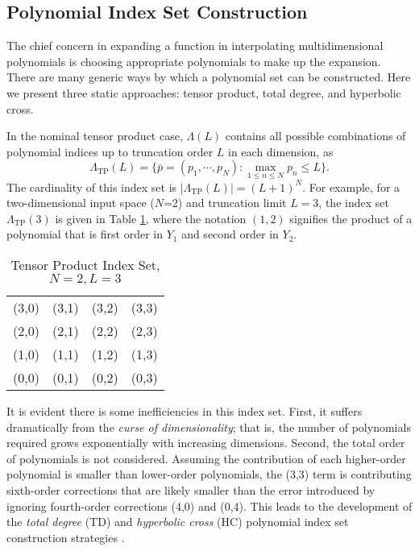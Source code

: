 \subsection{Polynomial Index Set Construction}\label{sec:index sets}
The chief concern in expanding a function in interpolating multidimensional polynomials is choosing appropriate polynomials to
make up the expansion.
There are many generic ways by which a polynomial set can be constructed.  Here we present three static
approaches: tensor
product, total degree, and hyperbolic cross.

In the nominal tensor
product case, $\Lambda(L)$ contains all possible combinations of polynomial indices up to truncation order $L$ in each
dimension, as
\begin{equation}
  \Lambda_\text{TP}(L)=\Big\{\bar p=(p_1,\cdots,p_N): \max_{1\leq n\leq N}p_n\leq L
\Big\}.
\end{equation}
The cardinality of this index set is $|\Lambda_\text{TP}(L)|=(L+1)^N$. For example, for a two-dimensional
input space ($N$=2) and truncation limit $L=3$, the index set $\Lambda_\text{TP}(3)$ is given in Table
\ref{tab:TP}, where the notation $(1,2)$ signifies the product of a polynomial that is first order in $Y_1$
and second order in $Y_2$.

\begin{table}[h]
  \centering
  \begin{tabular}{c c c c}
    (3,0) & (3,1) & (3,2) & (3,3) \\
    (2,0) & (2,1) & (2,2) & (2,3) \\
    (1,0) & (1,1) & (1,2) & (1,3) \\
    (0,0) & (0,1) & (0,2) & (0,3)
  \end{tabular}
  \caption{Tensor Product Index Set, $N=2,L=3$}
  \label{tab:TP}
\end{table}

It is evident there is some inefficiencies in this index set.  First, it suffers dramatically from the
\emph{curse of dimensionality}; that is, the number of polynomials required grows exponentially with
increasing dimensions.  Second, the total order of polynomials is not considered.  Assuming the contribution of
each higher-order polynomial is smaller than lower-order polynomials, the (3,3) term is
contributing sixth-order corrections that are likely smaller than the error introduced by ignoring
fourth-order corrections (4,0) and (0,4).  This leads to the development of the \emph{total degree} (TD) and
\emph{hyperbolic cross} (HC) polynomial index set construction strategies \cite{hctd}.


